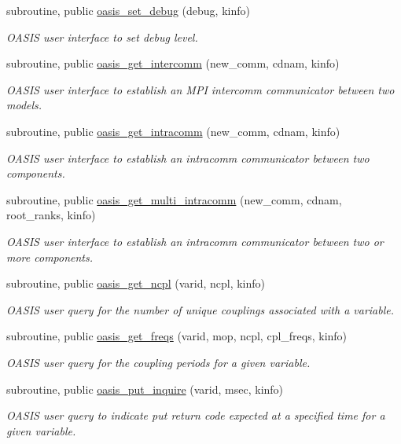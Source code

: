\begin{DoxyCompactItemize}
subroutine, public \hyperlink{namespacemod__oasis__auxiliary__routines_a71bf70a87b2d4ce86016bbb93d9edd73}{oasis\+\_\+set\+\_\+debug} (debug, kinfo)
\begin{DoxyCompactList}\small\item\em O\+A\+S\+IS user interface to set debug level. \end{DoxyCompactList}\item 
subroutine, public \hyperlink{namespacemod__oasis__auxiliary__routines_a589021c0f1427f8e5edb1c7efcd7fa2c}{oasis\+\_\+get\+\_\+intercomm} (new\+\_\+comm, cdnam, kinfo)
\begin{DoxyCompactList}\small\item\em O\+A\+S\+IS user interface to establish an M\+PI intercomm communicator between two models. \end{DoxyCompactList}\item 
subroutine, public \hyperlink{namespacemod__oasis__auxiliary__routines_aa1959db40e8c27dea289b97458929526}{oasis\+\_\+get\+\_\+intracomm} (new\+\_\+comm, cdnam, kinfo)
\begin{DoxyCompactList}\small\item\em O\+A\+S\+IS user interface to establish an intracomm communicator between two components. \end{DoxyCompactList}\item 
subroutine, public \hyperlink{namespacemod__oasis__auxiliary__routines_aaab3f229e1733a7d48ac0cc44d344c7f}{oasis\+\_\+get\+\_\+multi\+\_\+intracomm} (new\+\_\+comm, cdnam, root\+\_\+ranks, kinfo)
\begin{DoxyCompactList}\small\item\em O\+A\+S\+IS user interface to establish an intracomm communicator between two or more components. \end{DoxyCompactList}\item 
subroutine, public \hyperlink{namespacemod__oasis__auxiliary__routines_a154d3345ef9691e378afdc871086f7eb}{oasis\+\_\+get\+\_\+ncpl} (varid, ncpl, kinfo)
\begin{DoxyCompactList}\small\item\em O\+A\+S\+IS user query for the number of unique couplings associated with a variable. \end{DoxyCompactList}\item 
subroutine, public \hyperlink{namespacemod__oasis__auxiliary__routines_a62d1c98c05bcc4bd5e8796866bcce2db}{oasis\+\_\+get\+\_\+freqs} (varid, mop, ncpl, cpl\+\_\+freqs, kinfo)
\begin{DoxyCompactList}\small\item\em O\+A\+S\+IS user query for the coupling periods for a given variable. \end{DoxyCompactList}\item 
subroutine, public \hyperlink{namespacemod__oasis__auxiliary__routines_a7a95eb579171b6c2f06ff532c7823e2e}{oasis\+\_\+put\+\_\+inquire} (varid, msec, kinfo)
\begin{DoxyCompactList}\small\item\em O\+A\+S\+IS user query to indicate put return code expected at a specified time for a given variable. \end{DoxyCompactList}\end{DoxyCompactItemize}
